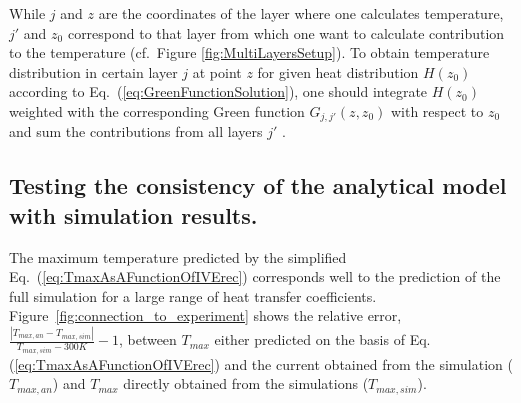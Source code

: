 \documentclass[%
9pt,
 aip,
rsi,%
 amsmath,amssymb,
preprint,%
]{revtex4-1}
\begin{document}
While $j$ and $z$ are the coordinates of the layer where one calculates temperature, $j'$ and $z_0$ correspond to that layer from which one want to calculate contribution to the temperature (cf.~Figure \ref{fig:MultiLayersSetup}). 
To obtain temperature distribution in certain layer $j$ at point $z$ for given heat distribution $H(z_0)$ according to Eq.~(\ref{eq:GreenFunctionSolution}), one should integrate $H(z_0)$ weighted with the corresponding Green function $G_{j,j'}(z,z_0)$ with respect to $z_0$ and sum the contributions from all layers $j'$ . 

\subsection*{Testing the consistency of the analytical model with simulation results.}

The maximum temperature predicted by the simplified Eq.~(\ref{eq:TmaxAsAFunctionOfIVErec}) corresponds well to the prediction of the full simulation for a large range of heat transfer coefficients.
Figure~\ref{fig:connection_to_experiment} shows the relative error,
$\frac{|T_{max,an} - T_{max,sim}| }{T_{max,sim}-300K} - 1$, between $T_{max}$ either predicted on the basis of Eq.(\ref{eq:TmaxAsAFunctionOfIVErec}) and the current obtained from the simulation ($T_{max,an}$) and $T_{max}$ directly obtained from the simulations ($T_{max,sim}$).
\end{document}
